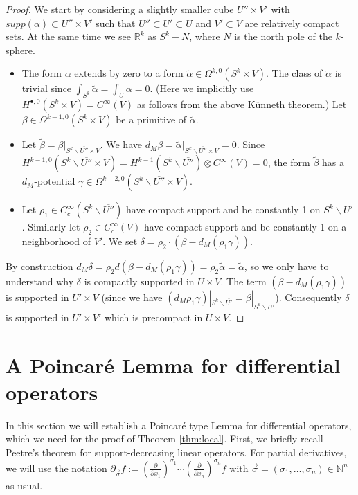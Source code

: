 \documentclass{article}
\newcommand{\N}{\mathbb{N}}
\theoremstyle{definition}
\begin{document}
\begin{proof}
We start by considering a slightly smaller cube $U''\times V'$ with $supp(\alpha)\subset U''\times V'$ such that $U''\subset U'\subset U$ and $V'\subset V$ are relatively compact sets. At the same time we see $\mathbb R^k$ as $S^k- N$, where $N$ is the north pole of the $k$-sphere. 
\begin{itemize}
\item The form $\alpha$ extends by zero to a form $\tilde \alpha\in \Omega^{k,0}(S^k\times V)$. The class of $\tilde \alpha$ is trivial since $\int_{S^k}\tilde\alpha=\int_U\alpha=0$. (Here we implicitly use  $H^{\bullet,0}(S^k\times V)=C^\infty(V)$ as follows from the above K\"unneth theorem.) Let $\beta\in \Omega^{k-1,0}(S^k\times V)$ be a primitive of $\tilde \alpha$.
\item Let  $\tilde\beta=\beta|_{S^k \backslash \overline{U''}\times V}$. We have $d_M\beta=\tilde\alpha|_{S^k \backslash \overline{U''}\times V}=0$. Since $H^{k-1,0}(S^k \backslash \overline{U''}\times V)=H^{k-1}(S^k \backslash \overline{U''})\otimes C^\infty(V)=0$, the form $\tilde\beta$ has a $d_M$-potential $\gamma\in \Omega^{k-2,0}(S^k \backslash\overline{ U''}\times V)$.

\item  Let $\rho_1\in C^{\infty}_c(S^k\backslash\overline{ U''})$ have compact support and be constantly 1 on $S^k\backslash U'$. Similarly let $\rho_2\in C^{\infty}_c(V)$ have compact support and be constantly 1 on a neighborhood of $V'$. We set $\delta=\rho_2\cdot(\beta-d_M(\rho_1\gamma))$.
\end{itemize}
By construction $d_M\delta=\rho_2d(\beta-d_M(\rho_1\gamma))=\rho_2\tilde \alpha=\tilde \alpha$, so we only have to understand why $\delta$ is compactly supported in $U\times V$. The term $(\beta-d_M(\rho_1\gamma))$ is supported in $U'\times V$ (since we have $(d_M\rho_1\gamma)|_{S^k\backslash \overline{U'}}=\beta|_{S^k\backslash \overline{U'}}$). Consequently $\delta$ is supported in $U'\times V'$ which is precompact in $U\times V$.
\end{proof}



\section{A Poincaré Lemma for differential operators}\label{Appendix:PoincareLemma}

\label{appendix:poincare}
In this section we will establish a Poincaré type Lemma for differential operators, which we need for the proof of Theorem \ref{thm:local}. First, we briefly recall Peetre's theorem for support-decreasing linear operators. 
For partial derivatives, we will use the notation 
$\partial_{\vec{\sigma}}f := (\frac{\partial}{\partial x_1})^{\sigma_1} \cdots (\frac{\partial}{\partial x_n})^{\sigma_n}f$
with $\vec{\sigma} = (\sigma_1, \ldots, \sigma_n) \in \N^{n}$ as usual.
\end{document}
